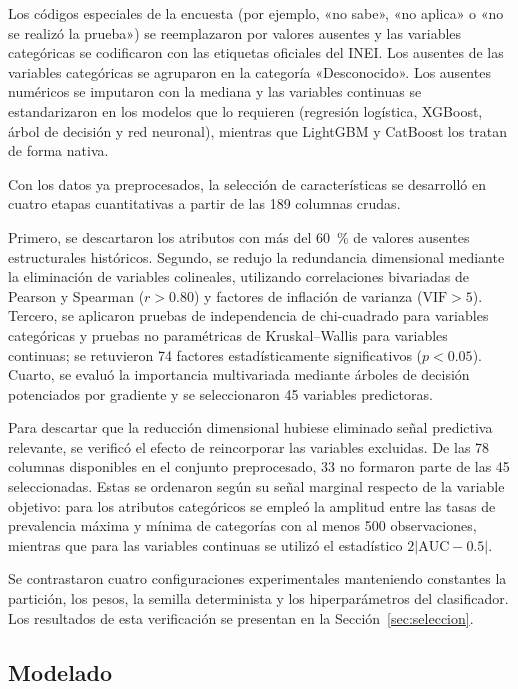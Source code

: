 \documentclass[final,5p,times,twocolumn,authoryear,lefttitle]{elsarticle}
\begin{document}
Los códigos especiales de la encuesta (por ejemplo, «no sabe», «no aplica» o «no se realizó la prueba») se reemplazaron por valores ausentes y las variables categóricas se codificaron con las etiquetas oficiales del INEI. Los ausentes de las variables categóricas se agruparon en la categoría «Desconocido». Los ausentes numéricos se imputaron con la mediana y las variables continuas se estandarizaron en los modelos que lo requieren (regresión logística, XGBoost, árbol de decisión y red neuronal), mientras que LightGBM y CatBoost los tratan de forma nativa.

Con los datos ya preprocesados, la selección de características se desarrolló en cuatro etapas cuantitativas a partir de las 189 columnas crudas.

Primero, se descartaron los atributos con más del 60~\% de valores ausentes estructurales históricos. Segundo, se redujo la redundancia dimensional mediante la eliminación de variables colineales, utilizando correlaciones bivariadas de Pearson y Spearman ($r>0.80$) y factores de inflación de varianza ($\mathrm{VIF}>5$). Tercero, se aplicaron pruebas de independencia de chi-cuadrado para variables categóricas y pruebas no paramétricas de Kruskal--Wallis para variables continuas; se retuvieron 74 factores estadísticamente significativos ($p<0.05$). Cuarto, se evaluó la importancia multivariada mediante árboles de decisión potenciados por gradiente y se seleccionaron 45 variables predictoras.

Para descartar que la reducción dimensional hubiese eliminado señal predictiva relevante, se verificó el efecto de reincorporar las variables excluidas. De las 78 columnas disponibles en el conjunto preprocesado, 33 no formaron parte de las 45 seleccionadas. Estas se ordenaron según su señal marginal respecto de la variable objetivo: para los atributos categóricos se empleó la amplitud entre las tasas de prevalencia máxima y mínima de categorías con al menos 500 observaciones, mientras que para las variables continuas se utilizó el estadístico $2\lvert\mathrm{AUC}-0.5\rvert$.

Se contrastaron cuatro configuraciones experimentales manteniendo constantes la partición, los pesos, la semilla determinista y los hiperparámetros del clasificador. Los resultados de esta verificación se presentan en la Sección~\ref{sec:seleccion}.

\subsection{Modelado}
\end{document}

